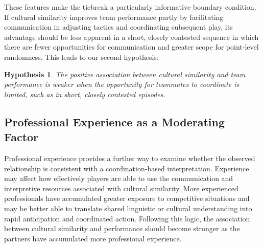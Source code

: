 \documentclass[10pt]{article}
\newtheorem{hypothesis}{Hypothesis}
\begin{document}

 These features make the tiebreak a particularly informative boundary condition. If cultural similarity improves team performance partly by facilitating communication in adjusting tactics and coordinating subsequent play, its advantage should be less apparent in a short, closely contested sequence in which there are fewer opportunities for communication and greater scope for point-level randomness. This leads to our second hypothesis:

\begin{hypothesis}
The positive association between cultural similarity and team performance is weaker when the opportunity for teammates to coordinate is limited, such as in short, closely contested episodes.
\end{hypothesis}

\subsection{Professional Experience as a Moderating Factor}

Professional experience provides a further way to examine whether the observed relationship is consistent with a coordination-based interpretation. Experience may affect how effectively players are able to use the communication and interpretive resources associated with cultural similarity. More experienced professionals have accumulated greater exposure to competitive situations and may be better able to translate shared linguistic or cultural understanding into rapid anticipation and coordinated action. Following this logic, the association between cultural similarity and performance should become stronger as the partners have accumulated more professional experience.
\end{document}
